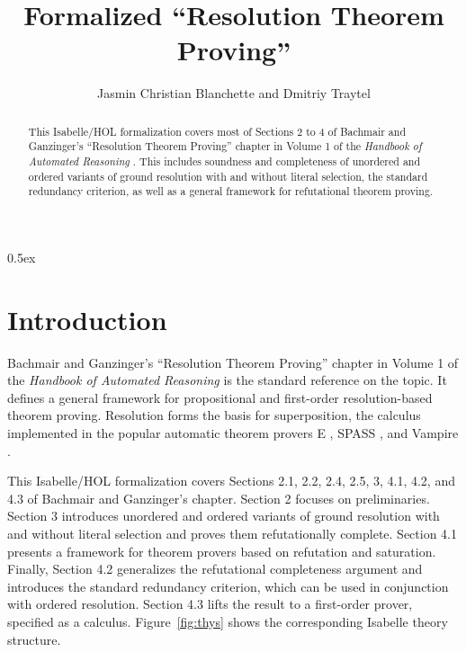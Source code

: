 \documentclass[10pt,a4paper]{article}
\begin{document}
\title{Formalized ``Resolution Theorem Proving''}
\author{Jasmin Christian Blanchette and Dmitriy Traytel}

\maketitle

\begin{abstract}
\noindent
This Isabelle/HOL formalization covers most of Sections 2 to 4 of Bachmair and
Ganzinger's ``Resolution Theorem Proving'' chapter
\cite{bachmair-ganzinger-2001} in Volume 1 of the \emph{Handbook of Automated
Reasoning} \cite{robinson-voronkov-2001-vol1}. This includes soundness and
completeness of unordered and ordered variants of ground resolution with and
without literal selection, the standard redundancy criterion, as well as a
general framework for refutational theorem proving.
\end{abstract}

\tableofcontents

\parindent 0pt
\parskip 0.5ex

\section{Introduction}

Bachmair and Ganzinger's ``Resolution Theorem Proving'' chapter
\cite{bachmair-ganzinger-2001} in Volume 1 of the \emph{Handbook of Automated
Reasoning} \cite{robinson-voronkov-2001-vol1} is the standard reference on the
topic. It defines a general framework for propositional and first-order
resolution-based theorem proving. Resolution forms the basis for superposition,
the calculus implemented in the popular automatic theorem provers E
\cite{schulz-2013}, SPASS \cite{weidenbach-et-al-2009}, and Vampire
\cite{hoder-voronkov-2010}.

\medskip

This Isabelle/HOL formalization covers Sections 2.1, 2.2, 2.4, 2.5, 3, 4.1,
4.2, and 4.3 of Bachmair and Ganzinger's chapter. Section 2 focuses on
preliminaries. Section 3 introduces unordered and ordered variants of ground
resolution with and without literal selection and proves them refutationally
complete. Section 4.1 presents a framework for theorem provers based on
refutation and saturation. Finally, Section 4.2 generalizes the refutational
completeness argument and introduces the standard redundancy criterion, which
can be used in conjunction with ordered resolution. Section 4.3 lifts the
result to a first-order prover, specified as a calculus. Figure~\ref{fig:thys}
shows the corresponding Isabelle theory structure.
\end{document}
